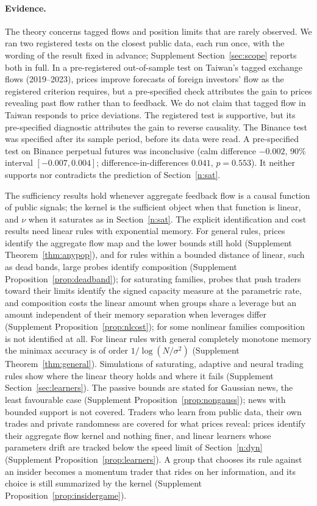 \paragraph{Evidence.} The theory concerns tagged flows and position limits that are rarely observed. We ran two registered tests on the closest public data, each run once, with the wording of the result fixed in advance; Supplement Section~\ref{sec:scope} reports both in full. In a pre-registered out-of-sample test on Taiwan's tagged exchange flows (2019--2023), prices improve forecasts of foreign investors' flow as the registered criterion requires, but a pre-specified check attributes the gain to prices revealing past flow rather than to feedback. We do not claim that tagged flow in Taiwan responds to price deviations. The registered test is supportive, but its pre-specified diagnostic attributes the gain to reverse causality. The Binance test was specified after its sample period, before its data were read. A pre-specified test on Binance perpetual futures was inconclusive (calm difference $-0.002$, 90\% interval $[-0.007, 0.004]$; difference-in-differences $0.041$, $p=0.553$). It neither supports nor contradicts the prediction of Section~\ref{n:sat}.

The sufficiency results hold whenever aggregate feedback flow is a causal function of public signals; the kernel is the sufficient object when that function is linear, and $\nu$ when it saturates as in Section~\ref{n:sat}. The explicit identification and cost results need linear rules with exponential memory. For general rules, prices identify the aggregate flow map and the lower bounds still hold (Supplement Theorem~\ref{thm:anypop}), and for rules within a bounded distance of linear, such as dead bands, large probes identify composition (Supplement Proposition~\ref{prop:deadband}); for saturating families, probes that push traders toward their limits identify the signed capacity measure at the parametric rate, and composition costs the linear amount when groups share a leverage but an amount independent of their memory separation when leverages differ (Supplement Proposition~\ref{prop:nlcost}); for some nonlinear families composition is not identified at all. For linear rules with general completely monotone memory the minimax accuracy is of order $1/\log(N/\sigma^2)$ (Supplement Theorem~\ref{thm:general}). Simulations of saturating, adaptive and neural trading rules show where the linear theory holds and where it fails (Supplement Section~\ref{sec:learners}). The passive bounds are stated for Gaussian news, the least favourable case (Supplement Proposition~\ref{prop:nongauss}); news with bounded support is not covered. Traders who learn from public data, their own trades and private randomness are covered for what prices reveal: prices identify their aggregate flow kernel and nothing finer, and linear learners whose parameters drift are tracked below the speed limit of Section~\ref{n:dyn} (Supplement Proposition~\ref{prop:learners}). A group that chooses its rule against an insider becomes a momentum trader that rides on her information, and its choice is still summarized by the kernel (Supplement Proposition~\ref{prop:insidergame}).

